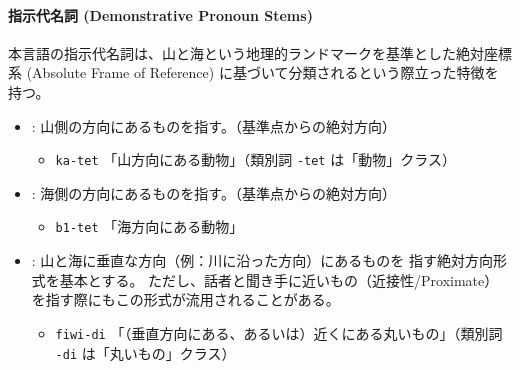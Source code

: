 \paragraph{指示代名詞 (Demonstrative Pronoun Stems)}
本言語の指示代名詞は、{山と海という地理的ランドマークを基準とした絶対座標系
 (Absolute Frame of Reference) に基づいて分類される}という際立った特徴を持つ。

\begin{itemize}
    \item \textbf{}: {山側}の方向にあるものを指す。（基準点からの絶対方向）
        \begin{itemize}
            \item \texttt{ka-tet}
            \quad 「山方向にある動物」（類別詞 \texttt{-tet} は「動物」クラス）
        \end{itemize}
    \item \textbf{}: {海側}の方向にあるものを指す。（基準点からの絶対方向）
        \begin{itemize}
            \item \texttt{b1-tet}
            \quad 「海方向にある動物」
        \end{itemize}
    \item \textbf{}: 山と海に{垂直な方向}（例：川に沿った方向）にあるものを
    指す{絶対方向形式}を基本とする。
    ただし、話者と聞き手に近いもの（近接性/Proximate）を指す際にもこの形式が流用されることがある。
        \begin{itemize}
            \item \texttt{fiwi-di}
            \quad 「（垂直方向にある、あるいは）近くにある丸いもの」（類別詞 \texttt{-di} は「丸いもの」クラス）
        \end{itemize}
\end{itemize}
